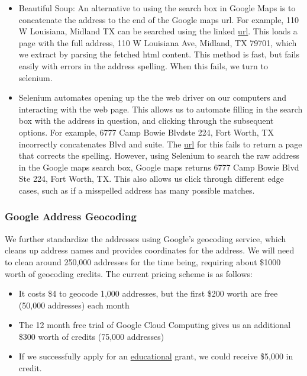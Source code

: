 \documentclass{article}
\begin{document}
\begin{itemize}
    \item Beautiful Soup: An alternative to using the search box in Google Maps is to concatenate the address to the end of the Google maps url. For example, 110 W Louisiana, Midland TX can be searched using the linked \href{https://www.google.com/maps/place/110+W+Louisiana+Ave,+Midland}{url}. This loads a page with the full address, 110 W Louisiana Ave, Midland, TX 79701, which we extract by parsing the fetched html content. This method is fast, but fails easily with errors in the address spelling. When this fails, we turn to selenium.
    \item Selenium automates opening up the the web driver on our computers and interacting with the web page. This allows us to automate filling in the search box with the address in question, and clicking through the subsequent options. For example, 6777 Camp Bowie Blvdste 224, Fort Worth, TX incorrectly concatenates Blvd and suite. The \href{https://www.google.com/maps/place/6777+Camp+Bowie+Blvdste+224,+Fort+Worth,+TX}{url} for this fails to return a page that corrects the spelling. However, using Selenium to search the raw address in the Google maps search box, Google maps returns 6777 Camp Bowie Blvd Ste 224, Fort Worth, TX. This also allows us click through different edge cases, such as if a misspelled address has many possible matches. \\
\end{itemize}
 \fi

\subsubsection{Google Address Geocoding}
We further standardize the addresses using Google's geocoding service, which cleans up address names and provides coordinates for the address. We will need to clean around 250,000 addresses for the time being, requiring about \$1000 worth of geocoding credits. The current pricing scheme is as follows:
\begin{itemize}
    \item It costs \$4 to geocode 1,000 addresses, but the first \$200 worth are free (50,000 addresses) each month
    \item The 12 month free trial of Google Cloud Computing gives us an additional \$300 worth of credits (75,000 addresses)
    \item If we successfully apply for an \href{https://lp.google-mkto.com/gcp-research-credits-FAQ.html}{educational} grant, we could receive \$5,000 in credit. 
\end{itemize}  
\end{document}
